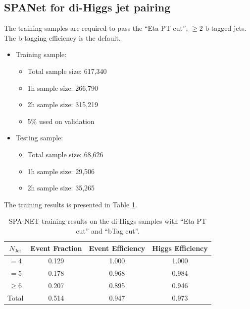 \documentclass[12pt]{article}
\begin{document}
	\subsection{SPANet for di-Higgs jet pairing}%
	\label{sub:spanet_for_di_higgs_jet_pairing}
		The training samples are required to pass the ``Eta PT cut'', $\ge 2$ b-tagged jets. The b-tagging efficiency is the default.
		\begin{itemize}
			\item Training sample:
			\begin{itemize}
				\item Total sample size: 617,340
				\item 1h sample size: 266,790
				\item 2h sample size: 315,219
				\item 5\% used on validation
			\end{itemize}
			\item Testing sample: 
			\begin{itemize}
				\item Total sample size: 68,626
				\item 1h sample size: 29,506
				\item 2h sample size: 35,265
			\end{itemize}
		\end{itemize}
		The training results is presented in Table \ref{tab:SPANet_diHiggs_2btag_default_pt_cut}.
		\begin{table}[htpb]
			\centering
			\caption{SPA-NET training results on the di-Higgs samples with ``Eta PT cut'' and ``bTag cut''.}
			\label{tab:SPANet_diHiggs_2btag_default_pt_cut}
			\begin{tabular}{c|c|cc}
				$N_\text{Jet}$ & Event Fraction & Event Efficiency & Higgs Efficiency \\
				\hline
				$=4$	  &   0.129             &    1.000              &    1.000             \\
				$=5$	  &   0.178             &    0.968              &    0.984             \\
				$\ge 6$	  &   0.207             &    0.895              &    0.946             \\
				Total	  &   0.514             &    0.947              &    0.973             \\
			\end{tabular}
		\end{table}

		



\end{document}
